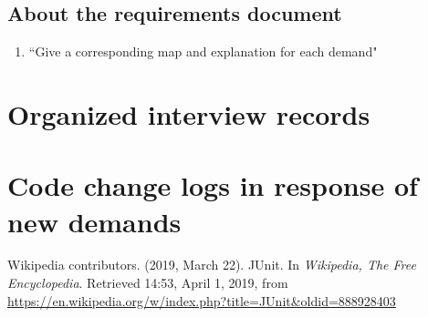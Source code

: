 \documentclass[a4paper]{report}
\begin{document}
\subsection{About the requirements document }
\begin{enumerate}
\item ``Give a corresponding map and explanation for each demand"
\end{enumerate}
\section{Organized interview records}
\section{Code change logs in response of new demands}

\begin{thebibliography}{A}


Wikipedia contributors. (2019, March 22). JUnit. In \emph{Wikipedia, The Free Encyclopedia}. Retrieved 14:53, April 1, 2019, from \url{https://en.wikipedia.org/w/index.php?title=JUnit&oldid=888928403}
\end{thebibliography}
\end{document}
